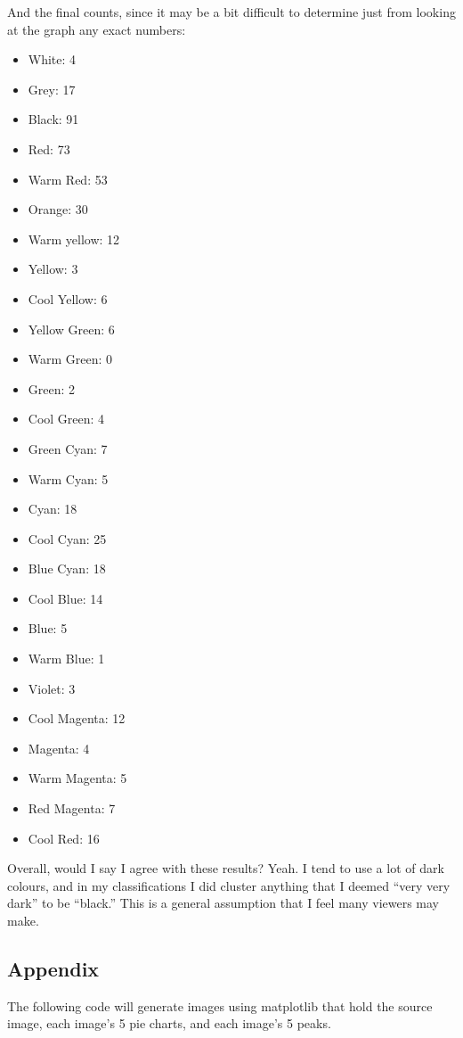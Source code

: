 \documentclass[11pt]{article}
\providecommand{\tightlist}{%
      \setlength{\itemsep}{0pt}\setlength{\parskip}{0pt}}
\begin{document}
And the final counts, since it may be a bit difficult to determine just
from looking at the graph any exact numbers:

\begin{itemize}
\tightlist
\item
  White: 4
\item
  Grey: 17
\item
  Black: 91
\item
  Red: 73
\item
  Warm Red: 53
\item
  Orange: 30
\item
  Warm yellow: 12
\item
  Yellow: 3
\item
  Cool Yellow: 6
\item
  Yellow Green: 6
\item
  Warm Green: 0
\item
  Green: 2
\item
  Cool Green: 4
\item
  Green Cyan: 7
\item
  Warm Cyan: 5
\item
  Cyan: 18
\item
  Cool Cyan: 25
\item
  Blue Cyan: 18
\item
  Cool Blue: 14
\item
  Blue: 5
\item
  Warm Blue: 1
\item
  Violet: 3
\item
  Cool Magenta: 12
\item
  Magenta: 4
\item
  Warm Magenta: 5
\item
  Red Magenta: 7
\item
  Cool Red: 16
\end{itemize}

Overall, would I say I agree with these results? Yeah. I tend to use a
lot of dark colours, and in my classifications I did cluster anything
that I deemed ``very very dark'' to be ``black.'' This is a general
assumption that I feel many viewers may make.

\hypertarget{appendix}{%
\subsection{Appendix}\label{appendix}}

The following code will generate images using matplotlib that hold the
source image, each image's 5 pie charts, and each image's 5 peaks.
\end{document}

